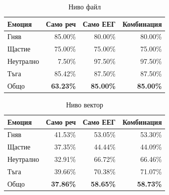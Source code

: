 \documentclass[9pt]{beamer}
\begin{document}
    \begin{frame}[t]
        \begin{table}[h]
        \begin{center}
            \begin{tabular}{|l|r r r|}
                \hline
                Емоция    & Само реч         & Само ЕЕГ         & Комбинация     \\
                \hline
                Гняв      & 85.00\%          & 80.00\%          & 80.00\%          \\
                Щастие    & 75.00\%          & 75.00\%          & 75.00\%          \\
                Неутрално & 7.50\%           & 97.50\%          & 97.50\%          \\
                Тъга      & 85.42\%          & 87.50\%          & 87.50\%          \\
                \hline
                \hline
                Общо      & \textbf{63.23\%} & \textbf{85.00\%} & \textbf{85.00\%} \\
                \hline
            \end{tabular}
            \caption*{Ниво файл}
        \end{center}
        \end{table}
        \pause
        \begin{table}[h]
            \begin{center}
                \begin{tabular}{|l|r r r|}
                    \hline
                    Емоция    & Само реч         & Само ЕЕГ         & Комбинация     \\
                    \hline
                    Гняв      & 41.53\%          & 53.05\%          & 53.30\%          \\
                    Щастие    & 37.35\%          & 44.44\%          & 44.09\%          \\
                    Неутрално & 32.91\%           & 66.72\%          & 66.46\%          \\
                    Тъга      & 39.66\%          & 70.38\%          & 71.07\%          \\
                    \hline
                    \hline
                    Общо      & \textbf{37.86\%} & \textbf{58.65\%} & \textbf{58.73\%} \\
                    \hline
                \end{tabular}
                \caption*{Ниво вектор}
            \end{center}
        \end{table}
    \end{frame}
\end{document}
